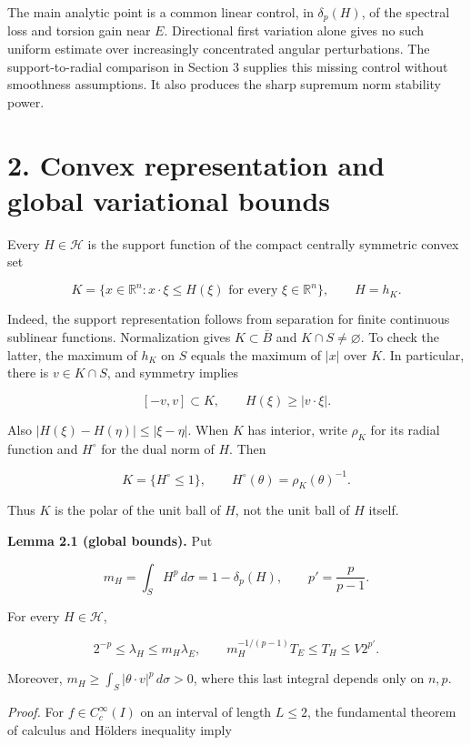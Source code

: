 \documentclass[11pt]{article}
\begin{document}
The main analytic point is a common linear control, in \(\delta_p(H)\),
of the spectral loss and torsion gain near \(E\). Directional first
variation alone gives no such uniform estimate over increasingly
concentrated angular perturbations. The support-to-radial comparison in
Section 3 supplies this missing control without smoothness assumptions.
It also produces the sharp supremum norm stability power.

\section{2. Convex representation and global variational
bounds}\label{convex-representation-and-global-variational-bounds}

Every \(H\in\mathcal H\) is the support function of the compact
centrally symmetric convex set

\[
K=\{x\in\mathbb R^n:x\cdot\xi\leq H(\xi)
\text{ for every }\xi\in\mathbb R^n\},
\qquad H=h_K.
\tag{2.1}
\]

Indeed, the support representation follows from separation for finite
continuous sublinear functions. Normalization gives
\(K\subset\overline B\) and \(K\cap S\ne\varnothing\). To check the
latter, the maximum of \(h_K\) on \(S\) equals the maximum of \(|x|\)
over \(K\). In particular, there is \(v\in K\cap S\), and symmetry
implies

\[
[-v,v]\subset K,
\qquad H(\xi)\geq|v\cdot\xi|.
\tag{2.2}
\]

Also \(|H(\xi)-H(\eta)|\leq|\xi-\eta|\). When \(K\) has interior, write
\(\rho_K\) for its radial function and \(H^\circ\) for the dual norm of
\(H\). Then

\[
K=\{H^\circ\leq1\},\qquad
H^\circ(\theta)=\rho_K(\theta)^{-1}.
\tag{2.3}
\]

Thus \(K\) is the polar of the unit ball of \(H\), not the unit ball of
\(H\) itself.

\textbf{Lemma 2.1 (global bounds).} Put

\[
m_H=\int_SH^p\,d\sigma=1-\delta_p(H),
\qquad p'=\frac p{p-1}.
\tag{2.4}
\]

For every \(H\in\mathcal H\),

\[
2^{-p}\leq\lambda_H\leq m_H\lambda_E,
\qquad
m_H^{-1/(p-1)}T_E\leq T_H\leq V2^{p'}.
\tag{2.5}
\]

Moreover, \(m_H\geq\int_S|\theta\cdot v|^p\,d\sigma>0\), where this last
integral depends only on \(n,p\).

\emph{Proof.} For \(f\in C_c^\infty(I)\) on an interval of length
\(L\leq2\), the fundamental theorem of calculus and
Hölder\textquotesingle s inequality imply
\end{document}
